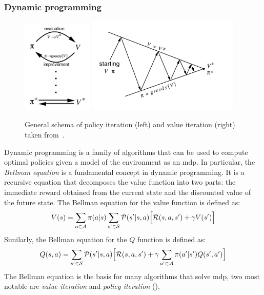 \subsubsection{Dynamic programming}
\begin{figure}
  \includegraphics[width=0.3\textwidth]{chapters/img/generalized-policy-improvement.png}
  \includegraphics[width=0.65\textwidth]{chapters/img/value-iteration.png}
  \caption[General schema of policy iteration (left) and value iteration (right)]{General schema of policy iteration (left) and value iteration (right) taken from~\cite{sutton-book}.}\label{fig:rl:dp}
\end{figure}
Dynamic programming is a family of algorithms that can be used to compute optimal policies 
 given a model of the environment as an \ac{mdp}.
%
In particular, the \emph{Bellman equation} is a fundamental concept in dynamic programming. 
 It is a recursive equation that decomposes the value function into two parts: 
 the immediate reward obtained from the current state and the discounted value of the future state. 
 The Bellman equation for the value function is defined as:
\begin{equation}
V(s) = \sum_{a \in \mathcal{A}} \pi(a|s) \sum_{s' \in \mathcal{S}} \mathcal{P}(s'|s, a) \Big[ \mathcal{R}(s, a, s') + \gamma V(s') \Big]
\end{equation}
%
Similarly, the Bellman equation for the $Q$ function is defined as:
\begin{equation}
Q(s, a) = \sum_{s' \in \mathcal{S}} \mathcal{P}(s'|s, a) \Big[ \mathcal{R}(s, a, s') + \gamma \sum_{a' \in \mathcal{A}} \pi(a'|s') Q(s', a') \Big]
\end{equation}
%
The Bellman equation is the basis for many algorithms that solve \ac{mdp},
two most notable are \emph{value iteration} and \emph{policy iteration} ().
